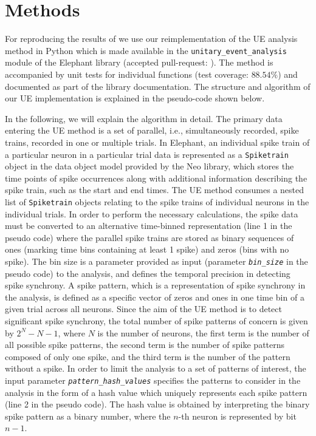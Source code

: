 \documentclass[10pt,a4paper,onecolumn]{article}
\begin{document}
\section{Methods}\label{methods}

For reproducing the results of \autocite{Riehle97} we use our
reimplementation of the UE analysis method in Python which is made
available in the \texttt{unitary\_event\_analysis} module of the
Elephant library (accepted pull-request: \autocite{Pullrequest_UE}). The
method is accompanied by unit tests for individual functions (test
coverage: \(88.54\%\)) and documented as part of the library
documentation. The structure and algorithm of our UE implementation is
explained in the pseudo-code shown below.

In the following, we will explain the algorithm in detail. The primary
data entering the UE method is a set of parallel, i.e., simultaneously
recorded, spike trains, recorded in one or multiple trials. In Elephant,
an individual spike train of a particular neuron in a particular trial
data is represented as a \texttt{Spiketrain} object in the data object
model provided by the Neo library, which stores the time points of spike
occurrences along with additional information describing the spike
train, such as the start and end times. The UE method consumes a nested
list of \texttt{Spiketrain} objects relating to the spike trains of
individual neurons in the individual trials. In order to perform the
necessary calculations, the spike data must be converted to an
alternative time-binned representation (line 1 in the pseudo code) where
the parallel spike trains are stored as binary sequences of ones
(marking time bins containing at least 1 spike) and zeros (bins with no
spike). The bin size is a parameter provided as input (parameter
\emph{\texttt{bin\_size}} in the pseudo code) to the analysis, and
defines the temporal precision in detecting spike synchrony. A spike
pattern, which is a representation of spike synchrony in the analysis,
is defined as a specific vector of zeros and ones in one time bin of a
given trial across all neurons. Since the aim of the UE method is to
detect significant spike synchrony, the total number of spike patterns
of concern is given by \(2^{N}-N-1\), where \(N\) is the number of
neurons, the first term is the number of all possible spike patterns,
the second term is the number of spike patterns composed of only one
spike, and the third term is the number of the pattern without a spike.
In order to limit the analysis to a set of patterns of interest, the
input parameter \emph{\texttt{pattern\_hash\_values}} specifies the
patterns to consider in the analysis in the form of a hash value which
uniquely represents each spike pattern (line 2 in the pseudo code). The
hash value is obtained by interpreting the binary spike pattern as a
binary number, where the \(n\)-th neuron is represented by bit \(n-1\).
\end{document}
